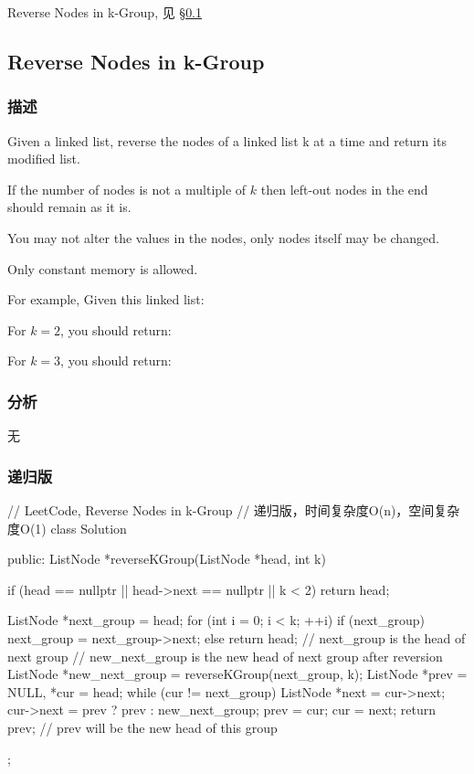 \begindot
\item Reverse Nodes in k-Group, 见 \S \ref{sec:reverse-nodes-in-k-group}
\myenddot


\subsection{Reverse Nodes in k-Group}
\label{sec:reverse-nodes-in-k-group}


\subsubsection{描述}
Given a linked list, reverse the nodes of a linked list k at a time and return 
its modified list.

If the number of nodes is not a multiple of $k$ then left-out nodes in the end 
should remain as it is.

You may not alter the values in the nodes, only nodes itself may be changed.

Only constant memory is allowed.

For example,
Given this linked list: 

For $k = 2$, you should return: 

For $k = 3$, you should return: 


\subsubsection{分析}
无


\subsubsection{递归版}
\begin{Code}
	// LeetCode, Reverse Nodes in k-Group
	// 递归版，时间复杂度O(n)，空间复杂度O(1)
	class Solution {
		public:
		ListNode *reverseKGroup(ListNode *head, int k) {
			if (head == nullptr || head->next == nullptr || k < 2)
			return head;
			
			ListNode *next_group = head;
			for (int i = 0; i < k; ++i) {
				if (next_group)
				next_group = next_group->next;
				else
				return head;
			}
			// next_group is the head of next group
			// new_next_group is the new head of next group after reversion
			ListNode *new_next_group = reverseKGroup(next_group, k);
			ListNode *prev = NULL, *cur = head;
			while (cur != next_group) {
				ListNode *next = cur->next;
				cur->next = prev ? prev : new_next_group;
				prev = cur;
				cur = next;
			}
			return prev; // prev will be the new head of this group
		}
	};
\end{Code}


